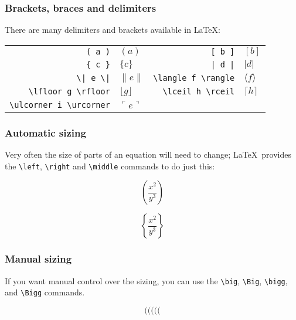 \documentclass[mathserif]{beamer}
\begin{document}
\begin{frame}[fragile]
\frametitle{Brackets, braces and delimiters}
\vfill
There are many delimiters and brackets available in \LaTeX:
\vfill
\begin{center}
\begin{tabular}{r | l | r | l }
	\texttt{( a )} & $( a )$ & \texttt{[ b ]} & $[b]$ \\
	\texttt{\{ c \}} & $\{c\}$ & \texttt{| d |} & $|d|$ \\
	\texttt{{\textbackslash}| e {\textbackslash}|} & $\| e \|$ & \texttt{{\textbackslash}langle f {\textbackslash}rangle} & $\langle f \rangle$ \\
	\texttt{{\textbackslash}lfloor g {\textbackslash}rfloor} & $\lfloor g \rfloor$ & \texttt{{\textbackslash}lceil h {\textbackslash}rceil} & $\lceil h \rceil$ \\
	\texttt{{\textbackslash}ulcorner i {\textbackslash}urcorner} & $\ulcorner e \urcorner$ &  & \\

\end{tabular}
\end{center}
\vfill
\end{frame}

\begin{frame}[fragile]
\frametitle{Automatic sizing}
\vfill
Very often the size of parts of an equation will need to change; \LaTeX\ provides the \texttt{{\textbackslash}left}, \texttt{{\textbackslash}right} and \texttt{{\textbackslash}middle} commands to do just this:
\vfill
	\begin{LTXexample}[style=latexsty]
		\[ \left(\frac{x^2}{y^3}\right) \]
	\end{LTXexample}
\vfill
	\begin{LTXexample}[style=latexsty]
		\[ \left\{\frac{x^2}{y^3}\right\} \]
	\end{LTXexample}
\vfill
\end{frame}

\begin{frame}[fragile]
\frametitle{Manual sizing}
\vfill
If you want manual control over the sizing, you can use the \texttt{{\textbackslash}big}, \texttt{{\textbackslash}Big}, \texttt{{\textbackslash}bigg}, and \texttt{{\textbackslash}Bigg} commands.
\vfill
	\begin{LTXexample}[style=latexsty]
		\[ ( \big( \Big( \bigg( \Bigg( \]
	\end{LTXexample}
\vfill
\end{frame}
\end{document}
